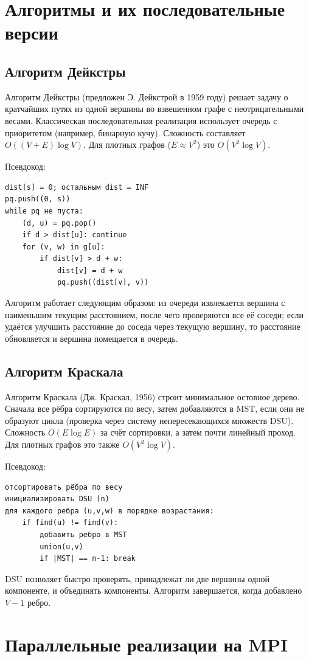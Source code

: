 \documentclass[14pt,a4paper]{article}
\begin{document}
\section{Алгоритмы и их последовательные версии}
\subsection{Алгоритм Дейкстры}
Алгоритм Дейкстры (предложен Э. Дейкстрой в 1959 году) решает задачу о кратчайших путях из одной вершины во взвешенном графе с неотрицательными весами. Классическая последовательная реализация использует очередь с приоритетом (например, бинарную кучу). Сложность составляет $O((V+E)\log V)$. Для плотных графов ($E \approx V^2$) это $O(V^2 \log V)$.

Псевдокод:
\begin{verbatim}
dist[s] = 0; остальным dist = INF
pq.push((0, s))
while pq не пуста:
    (d, u) = pq.pop()
    if d > dist[u]: continue
    for (v, w) in g[u]:
        if dist[v] > d + w:
            dist[v] = d + w
            pq.push((dist[v], v))
\end{verbatim}
Алгоритм работает следующим образом: из очереди извлекается вершина с наименьшим текущим расстоянием, после чего проверяются все её соседи; если удаётся улучшить расстояние до соседа через текущую вершину, то расстояние обновляется и вершина помещается в очередь.

\subsection{Алгоритм Краскала}
Алгоритм Краскала (Дж. Краскал, 1956) строит минимальное остовное дерево. Сначала все рёбра сортируются по весу, затем добавляются в MST, если они не образуют цикла (проверка через систему непересекающихся множеств DSU). Сложность $O(E \log E)$ за счёт сортировки, а затем почти линейный проход. Для плотных графов это также $O(V^2 \log V)$.

Псевдокод:
\begin{verbatim}
отсортировать рёбра по весу
инициализировать DSU (n)
для каждого ребра (u,v,w) в порядке возрастания:
    if find(u) != find(v):
        добавить ребро в MST
        union(u,v)
        if |MST| == n-1: break
\end{verbatim}
DSU позволяет быстро проверять, принадлежат ли две вершины одной компоненте, и объединять компоненты. Алгоритм завершается, когда добавлено $V-1$ ребро.

\section{Параллельные реализации на MPI}
\end{document}
